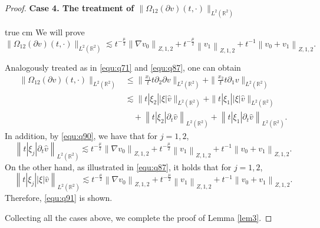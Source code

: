 \documentclass[11pt,twoside]{article}
\newcommand{\R}{\mathbb R}
\newcommand{\p}{\partial}
\newcommand{\f}{\frac}
\theoremstyle{plain}
\theoremstyle{definition}
\theoremstyle{remark}
\numberwithin{equation}{section}
\begin{document}
\begin{proof}
{\bf Case 4.  The treatment  of $\|\Omega_{12}(\p v)(t, \cdot)\|_{L^2(\R^2)}$}

 true cm
We will prove
\begin{equation}\label{equ:q91}
\|\Omega_{12}(\p v)(t, \cdot)\|_{L^2(\R^2)} \lesssim t^{-\f{\mu}{2}}\left\|\nabla v_0\right\|_{Z, 1, 2}
+t^{-\f{\mu}{2}}\left\| v_1\right\|_{Z, 1, 2}+t^{-1}\left\|v_0+v_1\right\|_{Z, 1, 2}.
\end{equation}

Analogously treated as in \eqref{equ:q71} and \eqref{equ:q87}, one can obtain
\begin{equation}\label{equ:q92}
\begin{aligned}
\|\Omega_{12}(\p v)(t, \cdot)\|_{L^2(\R^2)}
& \leq \|\f{x_1}{t}t\p_2\p v\|_{L^2(\R^2)}+\|\f{x_2}{t}t\p_1v\|_{L^2(\R^2)}\\
& \lesssim \|t|\xi_2||\xi|\hat{v}\|_{L^2(\R^2)}+\|t|\xi_1||\xi|\hat{v}\|_{L^2(\R^2)}\\
&\quad+\left\|t|\xi_2|\p_t\hat{v}\right\|_{L^2(\R^2)}+\left\|t|\xi_1|\p_t\hat{v}\right\|_{L^2(\R^2)}.
\end{aligned}
\end{equation}
In addition, by \eqref{equ:q90}, we have that for $j=1,2$,
$$
\left\|t|\xi_j|\p_t\hat{v}\right\|_{L^2(\R^2)} \lesssim t^{-\f{\mu}{2}}\left\|\nabla v_0\right\|_{Z, 1, 2}
+t^{-\f{\mu}{2}}\left\| v_1\right\|_{Z, 1, 2}+t^{-1}\left\|v_0+v_1\right\|_{Z, 1, 2}.
$$
On the other hand, as illustrated in \eqref{equ:q87}, it holds that for $j=1, 2$,
$$
\left\|t|\xi_j||\xi|\hat{v}\right\|_{L^2(\R^2)} \lesssim t^{-\f{\mu}{2}}\left\|\nabla v_0\right\|_{Z, 1, 2}
+t^{-\f{\mu}{2}}\left\| v_1\right\|_{Z, 1, 2}+t^{-1}\left\|v_0+v_1\right\|_{Z, 1, 2}.
$$
Therefore, \eqref{equ:q91} is shown.

Collecting all the cases above, we complete the proof of Lemma \ref{lem3}.





\end{proof}
\end{document}
